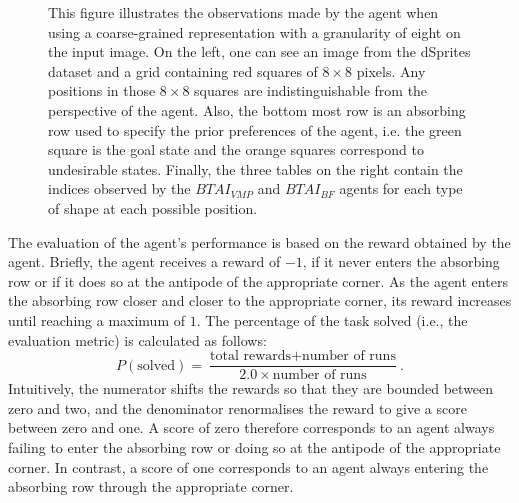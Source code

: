 \documentclass[twoside,11pt]{article}
\begin{document}
{\begin{figure}[H]
\begin{center}
	\end{center}
\vspace{-0.25cm}
    \caption{
This figure illustrates the observations made by the agent when using a coarse-grained representation with a granularity of eight on the input image. On the left, one can see an image from the dSprites dataset and a grid containing red squares of $8\times8$ pixels. Any positions in those $8\times8$ squares are indistinguishable from the perspective of the agent. Also, the bottom most row is an absorbing row used to specify the prior preferences of the agent, i.e. the green square is the goal state and the orange squares correspond to undesirable states. Finally, the three tables on the right contain the indices observed by the $BTAI_{VMP}$ and $BTAI_{BF}$ agents for each type of shape at each possible position.}
    \label{fig:down_sampling}
\end{figure}
}

The evaluation of the agent's performance is based on the reward obtained by the agent. Briefly, the agent receives a reward of $-1$, if it never enters the absorbing row or if it does so at the antipode of the appropriate corner. As the agent enters the absorbing row closer and closer to the appropriate corner, its reward increases until reaching a maximum of $1$. The percentage of the task solved (i.e., the evaluation metric) is calculated as follows:
$$P(\text{solved}) = \frac{\text{total rewards} + \text{number of runs}}{2.0 \times \text{number of runs}}.$$
Intuitively, the numerator shifts the rewards so that they are bounded between zero and two, and the denominator renormalises the reward to give a score between zero and one. A score of zero therefore corresponds to an agent always failing to enter the absorbing row or doing so at the antipode of the appropriate corner. In contrast, a score of one corresponds to an agent always entering the absorbing row through the appropriate corner.
\end{document}
